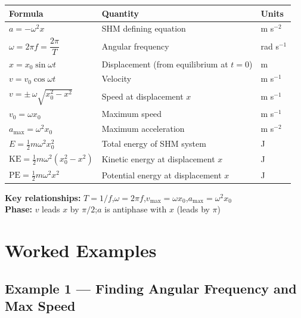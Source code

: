 \begin{minipage}{\linewidth}
\begin{tcolorbox}[colback=lightgold, colframe=accentgold]
\renewcommand{\arraystretch}{1.8}
\begin{tabular}{@{}lll@{}}
\toprule
\textbf{Formula} & \textbf{Quantity} & \textbf{Units} \\
\midrule
$a = -\omega^2 x$ & SHM defining equation & m s$^{-2}$ \\
$\omega = 2\pi f = \dfrac{2\pi}{T}$ & Angular frequency & rad s$^{-1}$ \\
$x = x_0\sin\omega t$ & Displacement (from equilibrium at $t=0$) & m \\
$v = v_0\cos\omega t$ & Velocity & m s$^{-1}$ \\
$v = \pm\,\omega\sqrt{x_0^2 - x^2}$ & Speed at displacement $x$ & m s$^{-1}$ \\
$v_0 = \omega x_0$ & Maximum speed & m s$^{-1}$ \\
$a_{\max} = \omega^2 x_0$ & Maximum acceleration & m s$^{-2}$ \\
$E = \tfrac{1}{2}m\omega^2 x_0^2$ & Total energy of SHM system & J \\
$\text{KE} = \tfrac{1}{2}m\omega^2(x_0^2 - x^2)$ & Kinetic energy at displacement $x$ & J \\
$\text{PE} = \tfrac{1}{2}m\omega^2 x^2$ & Potential energy at displacement $x$ & J \\
\bottomrule
\end{tabular}
\end{tcolorbox}

\vspace{0.5em}
\begin{tcolorbox}[colback=lightblue, colframe=darkblue]
\textbf{Key relationships:}\quad
$T = 1/f$,\quad $\omega = 2\pi f$,\quad $v_{\max} = \omega x_0$,\quad $a_{\max} = \omega^2 x_0$\\[0.3em]
\textbf{Phase:} $v$ leads $x$ by $\pi/2$;\quad $a$ is antiphase with $x$ (leads by $\pi$)
\end{tcolorbox}
\end{minipage}

\section{Worked Examples}

\subsection*{Example 1 — Finding Angular Frequency and Max Speed}

